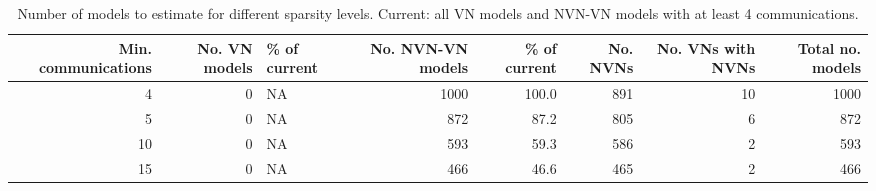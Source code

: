 \begin{table}

\caption{Number of models to estimate for different sparsity levels. Current: all VN models and NVN-VN models with at least 4 communications.}
\centering
\begin{tabular}[t]{rrlrrrrr}
\toprule
Min. communications & No. VN models & \% of current & No. NVN-VN models & \% of current & No. NVNs & No. VNs with NVNs & Total no. models\\
\midrule
4 & 0 & NA & 1000 & 100.0 & 891 & 10 & 1000\\
5 & 0 & NA & 872 & 87.2 & 805 & 6 & 872\\
10 & 0 & NA & 593 & 59.3 & 586 & 2 & 593\\
15 & 0 & NA & 466 & 46.6 & 465 & 2 & 466\\
\bottomrule
\end{tabular}
\end{table}
